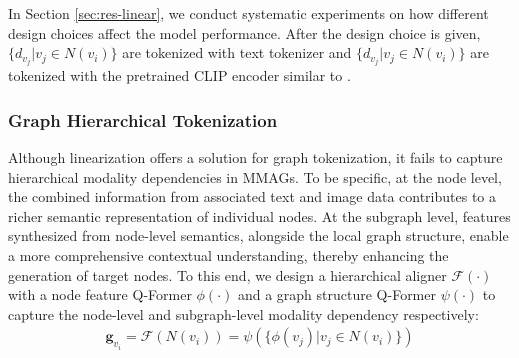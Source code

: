 In Section \ref{sec:res-linear}, we conduct systematic experiments on how different design choices affect the model performance.
After the design choice is given, $\{d_{v_j}| v_j\in N(v_i)\}$ are tokenized with text tokenizer and $\{d_{v_j}| v_j\in N(v_i)\}$ are tokenized with the pretrained CLIP encoder \cite{radford2021clip} similar to \cite{dong2024dreamllmsynergisticmultimodalcomprehension}. 

\subsubsection{Graph Hierarchical Tokenization}

Although linearization offers a solution for graph tokenization, it fails to capture hierarchical modality dependencies in MMAGs.
To be specific, at the node level, the combined information from associated text and image data contributes to a richer semantic representation of individual nodes. At the subgraph level, features synthesized from node-level semantics, alongside the local graph structure, enable a more comprehensive contextual understanding, thereby enhancing the generation of target nodes.
To this end, we design a hierarchical aligner $\mathcal{F}(\cdot)$ with a node feature Q-Former $\phi(\cdot)$ and a graph structure Q-Former $\psi(\cdot)$ to capture the node-level and subgraph-level modality dependency respectively:
\begin{gather}
    \bm{g}_{v_i} = \mathcal{F}(N(v_i)) = \psi(\{\phi(v_j) |v_j\in N(v_i)\})
\end{gather}

